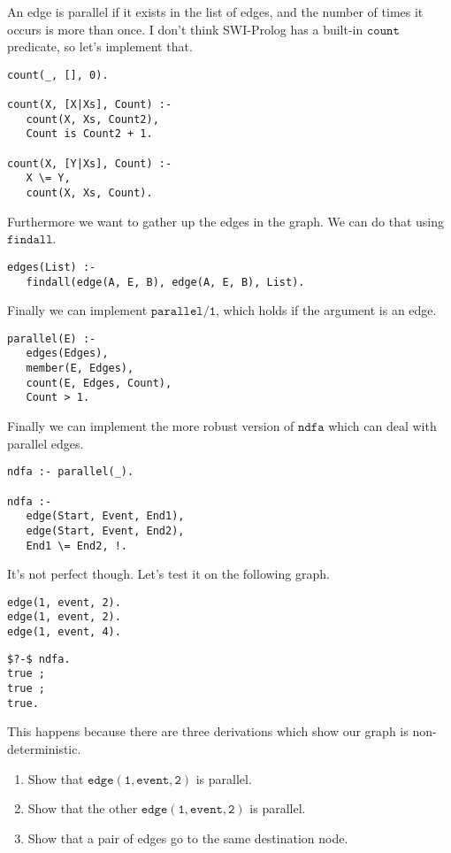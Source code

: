 \documentclass[a4paper,12pt]{article}
\newcommand{\kwa}[1]{\mathtt{#1}}
\begin{document}
An edge is parallel if it exists in the list of edges, and the number of times it occurs is more than once. I don't think SWI-Prolog has a built-in $\kwa{count}$ predicate, so let's implement that.

\begin{lstlisting}
count(_, [], 0).

count(X, [X|Xs], Count) :-
   count(X, Xs, Count2),
   Count is Count2 + 1.
   
count(X, [Y|Xs], Count) :-
   X \= Y,
   count(X, Xs, Count).
\end{lstlisting}

\noindent
Furthermore we want to gather up the edges in the graph. We can do that using $\kwa{findall}$.

\begin{lstlisting}
edges(List) :-
   findall(edge(A, E, B), edge(A, E, B), List).
\end{lstlisting}

\noindent
Finally we can implement $\kwa{parallel \slash 1}$, which holds if the argument is an edge.

\begin{lstlisting}
parallel(E) :-
   edges(Edges),
   member(E, Edges),
   count(E, Edges, Count),
   Count > 1.
\end{lstlisting}

\noindent
Finally we can implement the more robust version of $\kwa{ndfa}$ which can deal with parallel edges.

\begin{lstlisting}
ndfa :- parallel(_).

ndfa :-
   edge(Start, Event, End1),
   edge(Start, Event, End2),
   End1 \= End2, !.
\end{lstlisting}

\noindent
It's not perfect though. Let's test it on the following graph.

\begin{lstlisting}
edge(1, event, 2).
edge(1, event, 2).
edge(1, event, 4).
\end{lstlisting}

\begin{lstlisting}
$?-$ ndfa.
true ;
true ;
true.
\end{lstlisting}

\noindent
This happens because there are three derivations which show our graph is non-deterministic.

\begin{enumerate}
	\item Show that $\kwa{edge(1, event, 2)}$ is parallel.
	\item Show that the other $\kwa{edge(1, event, 2)}$ is parallel.
	\item Show that a pair of edges go to the same destination node.
\end{enumerate}
\end{document}
